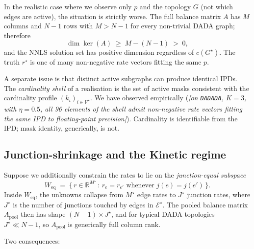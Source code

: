 \documentclass[11pt, a4paper]{article}
\newcommand{\note}[1]{\textcolor{red!70!black}{\textit{[#1]}}}
\newcommand{\R}{\mathbb{R}}
\newcommand{\rstar}{r^{\star}}
\newcommand{\Estar}{\mathcal{E}^{\star}}
\newcommand{\Gstar}{G^{\star}}
\begin{document}
In the realistic case where we observe only $p$ and the topology $G$ (not which edges are active), the situation is strictly worse. The full balance matrix $A$ has $M$ columns and $N - 1$ rows with $M > N - 1$ for every non-trivial DADA graph; therefore
\[
\dim \ker(A) \;\geq\; M - (N - 1) \;>\; 0,
\]
and the NNLS solution set has positive dimension regardless of $c(\Gstar)$. The truth $\rstar$ is one of many non-negative rate vectors fitting the same $p$.

A separate issue is that distinct active subgraphs can produce identical IPDs. The \emph{cardinality shell} of a realisation is the set of active masks consistent with the cardinality profile $(k_i)_{i \in \mathcal{V}^{\star}}$. We have observed empirically (\note{on \texttt{DADADA}, $K = 3$, with $\eta = 0.5$, all 96 elements of the shell admit non-negative rate vectors fitting the same IPD to floating-point precision}). Cardinality is identifiable from the IPD; mask identity, generically, is not.

\subsection{Junction-shrinkage and the Kinetic regime}
\label{sec:junction-shrinkage}

Suppose we additionally constrain the rates to lie on the \emph{junction-equal subspace}
\[
W_{\mathrm{eq}} \;=\; \big\{\, r \in \R^{M^{\star}} \,:\, r_{e} = r_{e'} \text{ whenever } j(e) = j(e') \,\big\}.
\]
Inside $W_{\mathrm{eq}}$, the unknowns collapse from $M^{\star}$ edge rates to $J^{\star}$ junction rates, where $J^{\star}$ is the number of junctions touched by edges in $\Estar$. The pooled balance matrix $A_{\mathrm{pool}}$ then has shape $(N - 1) \times J^{\star}$, and for typical DADA topologies $J^{\star} \ll N - 1$, so $A_{\mathrm{pool}}$ is generically full column rank.

Two consequences:
\end{document}
